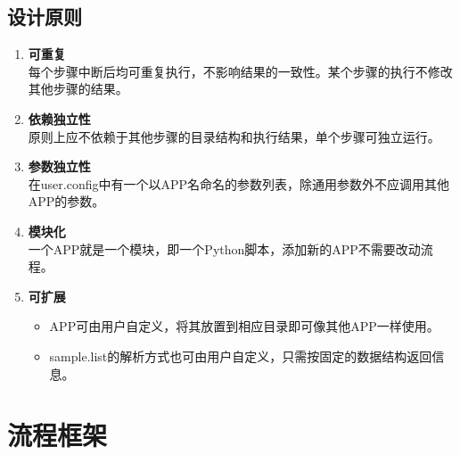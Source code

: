 \documentclass[UTF8,10pt,a4paper]{ctexart}
\begin{document}
\subsection{设计原则}
\begin{enumerate}
\item \textbf{可重复}\\
 每个步骤中断后均可重复执行，不影响结果的一致性。某个步骤的执行不修改其他步骤的结果。
\item \textbf{依赖独立性}\\
原则上应不依赖于其他步骤的目录结构和执行结果，单个步骤可独立运行。
\item \textbf{参数独立性}\\
 在user.config中有一个以APP名命名的参数列表，除通用参数外不应调用其他APP的参数。
\item \textbf{模块化}\\
 一个APP就是一个模块，即一个Python脚本，添加新的APP不需要改动流程。
\item \textbf{可扩展}
\begin{itemize}
\item APP可由用户自定义，将其放置到相应目录即可像其他APP一样使用。
\item sample.list的解析方式也可由用户自定义，只需按固定的数据结构返回信息。
\end{itemize}



\end{enumerate}
\newpage
\section{流程框架}
\label{sec:2}
\end{document}
